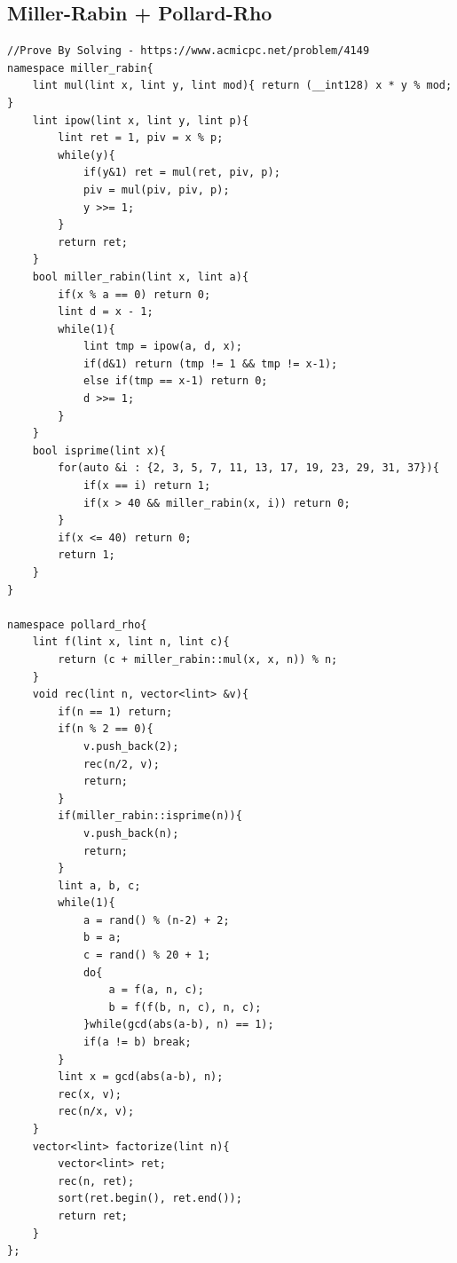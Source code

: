 \documentclass[landscape, 8pt, a4paper, oneside, twocolumn]{extarticle}
\begin{document}
\subsection{Miller-Rabin + Pollard-Rho}
\begin{verbatim}
//Prove By Solving - https://www.acmicpc.net/problem/4149
namespace miller_rabin{
    lint mul(lint x, lint y, lint mod){ return (__int128) x * y % mod; }
    lint ipow(lint x, lint y, lint p){
        lint ret = 1, piv = x % p;
        while(y){
            if(y&1) ret = mul(ret, piv, p);
            piv = mul(piv, piv, p);
            y >>= 1;
        }
        return ret;
    }
    bool miller_rabin(lint x, lint a){
        if(x % a == 0) return 0;
        lint d = x - 1;
        while(1){
            lint tmp = ipow(a, d, x);
            if(d&1) return (tmp != 1 && tmp != x-1);
            else if(tmp == x-1) return 0;
            d >>= 1;
        }
    }
    bool isprime(lint x){
        for(auto &i : {2, 3, 5, 7, 11, 13, 17, 19, 23, 29, 31, 37}){
            if(x == i) return 1;
            if(x > 40 && miller_rabin(x, i)) return 0;
        }
        if(x <= 40) return 0;
        return 1;
    }
}

namespace pollard_rho{
    lint f(lint x, lint n, lint c){
        return (c + miller_rabin::mul(x, x, n)) % n;
    }
    void rec(lint n, vector<lint> &v){
        if(n == 1) return;
        if(n % 2 == 0){
            v.push_back(2);
            rec(n/2, v);
            return;
        }
        if(miller_rabin::isprime(n)){
            v.push_back(n);
            return;
        }
        lint a, b, c;
        while(1){
            a = rand() % (n-2) + 2;
            b = a;
            c = rand() % 20 + 1;
            do{
                a = f(a, n, c);
                b = f(f(b, n, c), n, c);
            }while(gcd(abs(a-b), n) == 1);
            if(a != b) break;
        }
        lint x = gcd(abs(a-b), n);
        rec(x, v);
        rec(n/x, v);
    }
    vector<lint> factorize(lint n){
        vector<lint> ret;
        rec(n, ret);
        sort(ret.begin(), ret.end());
        return ret;
    }
};
\end{verbatim}
\end{document}
